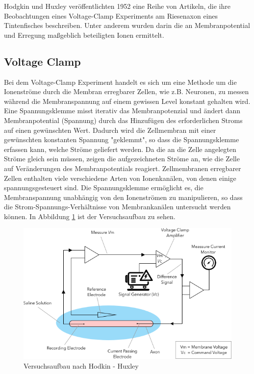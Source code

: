 \documentclass[a4paper]{article}
\begin{document}
\newpage
\noindent Hodgkin und Huxley veröffentlichten 1952 eine Reihe von Artikeln, die ihre Beobachtungen eines Voltage-Clamp Experiments am Riesenaxon eines Tintenfisches beschreiben. Unter anderem wurden darin die an Membranpotential und Erregung maßgeblich beteiligten Ionen ermittelt.\cite{HodgkinHuxley2} \cite{HodgkinHuxleySummary}\\


\subsection{Voltage Clamp}
\noindent Bei dem Voltage-Clamp Experiment handelt es sich um eine Methode um die 
Ionenströme durch die Membran erregbarer Zellen, wie z.B. Neuronen, zu messen
während die Membranspannung auf einem gewissen Level konstant gehalten wird.
Eine Spannungsklemme misst iterativ das Membranpotenzial und ändert dann Membranpotential (Spannung) durch das Hinzufügen des erforderlichen Stroms auf einen gewünschten Wert. 
Dadurch wird die Zellmembran mit einer gewünschten konstanten Spannung "geklemmt", so dass die Spannungsklemme erfassen kann, welche Ströme geliefert werden. Da die an die Zelle angelegten Ströme gleich sein müssen, zeigen die aufgezeichneten Ströme an, wie die Zelle auf Veränderungen des Membranpotentials reagiert. Zellmembranen erregbarer Zellen enthalten viele verschiedene Arten von Ionenkanälen, von denen einige spannungsgesteuert sind. Die Spannungsklemme ermöglicht es, die Membranspannung unabhängig von den Ionenströmen zu manipulieren, so dass die Strom-Spannungs-Verhältnisse von Membrankanälen untersucht werden können. In Abbildung \ref{fig:VersuchsaufbauHH} ist der Versuchsaufbau zu sehen. \\

\begin{figure}[H]
    \centering
    \includegraphics[scale=0.6]{images/Versuchsaufbau_VoltageClamp.png}
    \caption{Versuchsaufbau nach Hodkin - Huxley}
    \label{fig:VersuchsaufbauHH}
\end{figure}
\vspace{2.0\baselineskip}
\end{document}
